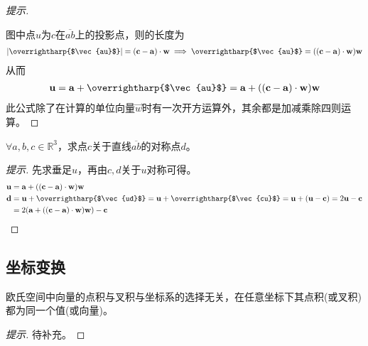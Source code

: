 \begin{proof}[提示]
\begin{center}
  \end{center}
  图中点$u$为$c$在$\overline{ab}$上的投影点，则的长度为
  \begin{align*}
    \left|\text{\overrightharp{$\vec{au}$}}\right| = (\vec c - \vec a)\cdot \vec w \implies
    \text{\overrightharp{$\vec{au}$}} = ((\vec c - \vec a)\cdot \vec w) \vec w
  \end{align*}
  从而
  \begin{align*}
    \vec u = \vec a + \text{\overrightharp{$\vec{au}$}} = \vec a + ((\vec c -\vec a)\cdot \vec w) \vec w
  \end{align*}
  此公式除了在计算的单位向量$\vec w$时有一次开方运算外，其余都是加减乘除四则运算。
\end{proof}


\begin{example}
  $\forall a, b, c\in\mathbb{R}^3$，求点$c$关于直线$\overline{ab}$的对称点$d$。
\end{example}
\begin{proof}[提示]
  先求垂足$u$，再由$c,d$关于$u$对称可得。
  \begin{align*}
    \vec u ={}& \vec a + ((\vec c -\vec a)\cdot \vec w) \vec w\\
    \vec d ={}& \vec u + \text{\overrightharp{$\vec{ud}$}} = \vec u + \text{\overrightharp{$\vec{cu}$}} = \vec u + (\vec u - \vec c) = 2\vec u - \vec c\\
           ={}& 2(\vec a + ((\vec c -\vec a)\cdot \vec w) \vec w) - \vec c \qedhere
  \end{align*}
\end{proof}

\subsection{坐标变换}
\label{sec:coordinate-transform}

\begin{theorem}[点积与叉积是坐标变换下的不变量]
  欧氏空间中向量的点积与叉积与坐标系的选择无关，在任意坐标下其点积(或叉积)都为同一个值(或向量)。
\end{theorem}
\begin{proof}[提示]
  \color{red}待补充。
\end{proof}

